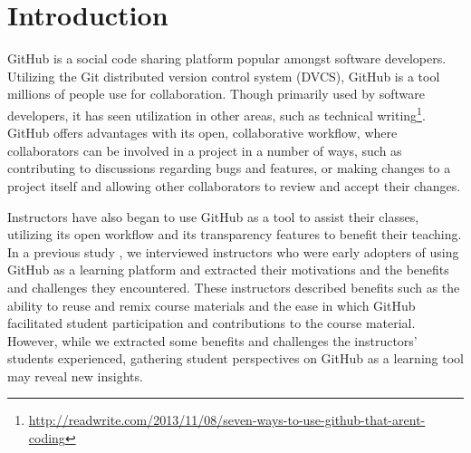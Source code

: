 \section{Introduction}


GitHub is a social code sharing platform popular amongst software developers. Utilizing the Git distributed version control system (DVCS), GitHub is a tool millions of people use for collaboration. Though primarily used by software developers, it has seen utilization in other areas, such as technical writing\footnote{\url{http://readwrite.com/2013/11/08/seven-ways-to-use-github-that-arent-coding}}. GitHub offers advantages with its open, collaborative workflow, where collaborators can be involved in a project in a number of ways, such as contributing to discussions regarding bugs and features, or making changes to a project itself and allowing other collaborators to review and accept their changes.

Instructors have also began to use GitHub as a tool to assist their classes, utilizing its open workflow and its transparency features to benefit their teaching. In a previous study \cite{zagalsky2015emergence}, we interviewed instructors who were early adopters of using GitHub as a learning platform and extracted their motivations and the benefits and challenges they encountered. These instructors described benefits such as the ability to reuse and remix course materials and the ease in which GitHub facilitated student participation and contributions to the course material. However, while we extracted some benefits and challenges the instructors' students experienced, gathering student perspectives on GitHub as a learning tool may reveal new insights.



